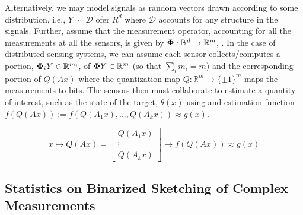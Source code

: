 Alternatively, we may model signals as random vectors drawn according
to some distribution, i.e., $Y\sim~\mathcal{D}$ ofer $R^d$
 where $\mathcal{D}$ accounts
for any structure in the signals. Further, assume that the measurement
operator, accounting for all the measurements at all the sensors, is
given by $\mathbf{\Phi}:\mathbb{R}^d \to \mathbb{R}^m$,  . In
the case of distributed sensing systems, we can assume each sensor
collects/computes a portion, $\mathbf{\Phi}_i Y \in \mathbb{R}^{m_i}$, of
$\mathbf{\Phi} Y \in \mathbb{R}^m$ (so that $\sum_i{m_i}=m$) and the corresponding portion
of ${Q}(Ax)$ where the quantization map $Q: \mathbb{R}^m \to \{\pm
1\}^m $ maps the measurements to bits. The sensors then must
collaborate to estimate a  quantity of interest,
such as the state of the target, 
$\theta(x)$ using and estimation function $f(Q(Ax)):=f\left(Q(A_1x),...,Q(A_kx)\right)\approx g(x)$.

\begin{equation}\label{eq:binaryembedding}
x 
\mapsto Q(Ax) =\left[ \begin{array}{c} Q(A_1 x) \\ \vdots \\ Q(A_k x) \end{array}\right] \mapsto f(Q(Ax))\approx g(x)
\end{equation}




\subsection{Statistics on Binarized Sketching of Complex Measurements}


